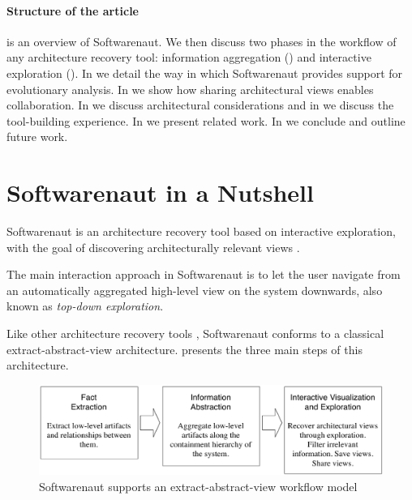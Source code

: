 \documentclass[preprint,12pt]{elsarticle}
\begin{document}
\paragraph{Structure of the article}  is an overview of Softwarenaut. We then discuss two phases in the workflow of any architecture recovery tool: information aggregation () and interactive exploration (). In  we detail the way in which Softwarenaut provides support for evolutionary analysis. In  we show how sharing architectural views enables collaboration. In  we discuss architectural considerations and in  we discuss the tool-building experience. In  we present related work. In  we conclude and outline future work.

\section {Softwarenaut in a Nutshell} \label{sec:over}

Softwarenaut is an architecture recovery tool based on interactive exploration, with the goal of discovering architecturally relevant views \cite{lungu-packages}.

The main interaction approach in Softwarenaut is to let the user navigate from an automatically aggregated high-level view on the system downwards, also known as {\em top-down exploration}.

Like other architecture recovery tools \cite{pollet-sar}, Softwarenaut conforms to a classical extract-abstract-view architecture.  presents the three main steps of this architecture. 

\begin{figure}[ht]
\begin{center}
\includegraphics[width=\linewidth]{SnautWorkflow}
\caption{Softwarenaut supports an extract-abstract-view workflow model}
\end{center}
\end{figure}
\end{document}
